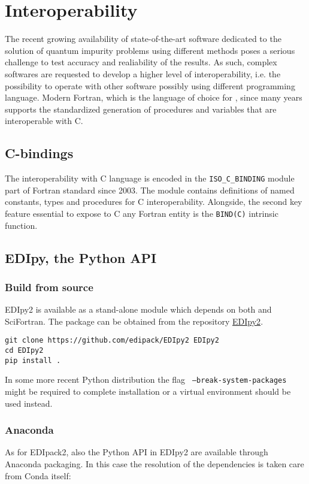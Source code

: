 \section{Interoperability}
The recent growing availability of state-of-the-art software dedicated
to the solution of quantum impurity problems using different methods
poses a serious challenge to test accuracy and realiability of the
results.
As such, complex softwares are requested to develop a higher level of
interoperability, i.e. the possibility to operate with other software
possibly using different programming language.
Modern Fortran, which is the language of choice for \NAME, since many
years supports the standardized generation of procedures and
variables that are interoperable with C.


\subsection{C-bindings}\label{sSecCbind}
The interoperability with C language is encoded in the
{\tt ISO\_C\_BINDING} module part of Fortran
standard since 2003. The module contains definitions of named
constants, types and procedures for C interoperability.
Alongside, the second key feature essential to expose to C any Fortran
entity is the {\tt BIND(C)} intrinsic function.



\subsection{EDIpy, the Python API}\label{SecPyAPI}

\subsubsection{Build from source}
EDIpy2 is available as a stand-alone
module which depends on both \NAME and SciFortran. The package can be
obtained from the repository
\href{https://github.com/EDIpack/EDIpy2.0}{EDIpy2}.

\begin{lstlisting}[style=mybash]
git clone https://github.com/edipack/EDIpy2 EDIpy2
cd EDIpy2
pip install . 
\end{lstlisting}
In some more recent Python distribution the flag {\tt
  --break-system-packages} might be required to complete
installation or a virtual environment should be used instead. 

\subsubsection{Anaconda}
As for EDIpack2, also the Python API in EDIpy2 are available through
Anaconda packaging. In this case the resolution of the dependencies is
taken care from Conda itself:

